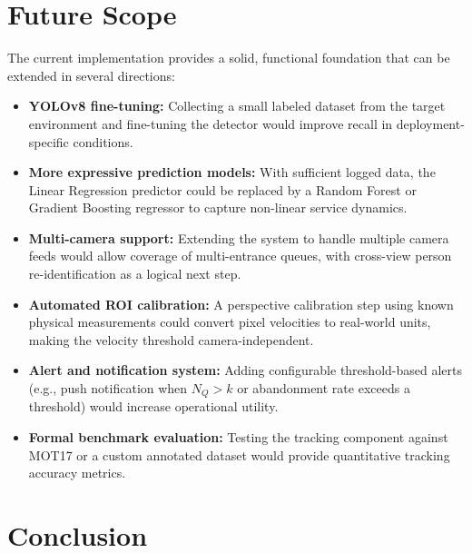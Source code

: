 \documentclass[journal, twocolumn]{IEEEtran}
\begin{document}
\section{Future Scope}
\label{sec:future}

The current implementation provides a solid, functional foundation that can be extended in several directions:

\begin{itemize}
    \item \textbf{YOLOv8 fine-tuning:} Collecting a small labeled dataset from the target environment and fine-tuning the detector would improve recall in deployment-specific conditions.
    \item \textbf{More expressive prediction models:} With sufficient logged data, the Linear Regression predictor could be replaced by a Random Forest or Gradient Boosting regressor to capture non-linear service dynamics.
    \item \textbf{Multi-camera support:} Extending the system to handle multiple camera feeds would allow coverage of multi-entrance queues, with cross-view person re-identification as a logical next step.
    \item \textbf{Automated ROI calibration:} A perspective calibration step using known physical measurements could convert pixel velocities to real-world units, making the velocity threshold camera-independent.
    \item \textbf{Alert and notification system:} Adding configurable threshold-based alerts (e.g., push notification when $N_Q > k$ or abandonment rate exceeds a threshold) would increase operational utility.
    \item \textbf{Formal benchmark evaluation:} Testing the tracking component against MOT17 or a custom annotated dataset would provide quantitative tracking accuracy metrics.
\end{itemize}

\section{Conclusion}
\label{sec:conclusion}
\end{document}
